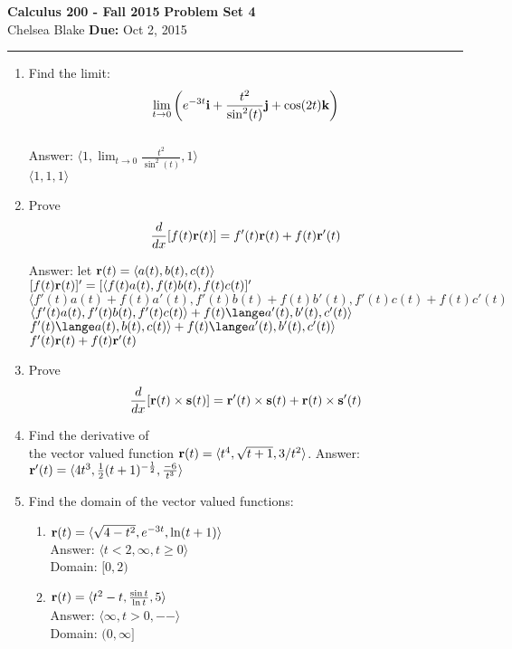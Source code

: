 \documentclass[11pt]{article}
\newcommand{\hwheadings}[3]{
{\bf Calculus 200 -  Fall 2015} \hfill {{\bf Problem Set #1}}\\
{{\bf } #2} \hfill {{\bf Due:} #3} \\
\rule[0.1in]{\textwidth}{0.025in}
}
\begin{document}
\hwheadings{4}{Chelsea Blake}{Oct 2, 2015}


\begin{enumerate}

 \item Find the limit: $$ \lim_{t \to 0} \left( e^{-3t} {\bf i} + \frac{t^2}{\sin^2(t)} {\bf j} + \cos (2t) {\bf k}  \right)$$
 \\
 Answer:
$\langle 1, \lim_{t \to 0}  \frac{t^2}{\sin^2(t)}, 1 \rangle  $
\\
$\langle 1, 1, 1 \rangle  $



\item Prove $$\frac{d}{dx}[f(t) {\bf r}(t)] = f'(t) {\bf r}(t)  + f(t) {\bf r}'(t) $$   

Answer: let ${\bf r}(t)= \langle a(t),b(t),c(t) \rangle$
\\
$[f(t){\bf r}(t)]'=[\langle f(t)a(t),f(t)b(t),f(t)c(t)]'$
\\
$\langle f'(t)a(t)+f(t)a'(t),f'(t)b(t)+f(t)b'(t),f'(t)c(t)+f(t)c'(t)$
\\
$\langle f'(t)a(t),f'(t)b(t),f'(t)c(t)\rangle + f(t)\lange a'(t),b'(t),c'(t)\rangle$
\\
$f'(t)\lange a(t),b(t),c(t)\rangle+ f(t)\lange a'(t),b'(t),c'(t)\rangle$
\\
$f'(t)  {\bf r}(t) + f(t) {\bf r}'(t)$



\item Prove $$\frac{d}{dx}[{\bf r}(t) \times {\bf s}(t)] = {\bf r}'(t) \times {\bf s}(t) + {\bf r}(t) \times {\bf s}'(t)$$    





\item Find the derivative of
\\the vector valued function ${\bf r}(t) = \langle t^4, \sqrt{t+1}, 3/t^2 \rangle$.
Answer:
\\
$ {\bf r}'(t)= \langle 4t^3,\frac{1}{2}(t+1)^{-\frac{1}{2}}, \frac{-6}{t^3} \rangle$




    \item Find the domain of the vector valued functions:
    \begin{enumerate}
        \item ${\bf r}(t) = \langle \sqrt{4-t^2}, e^{-3t}, \ln(t+1) \rangle$
        \\
        Answer: $\langle t<2, \infty, t \ge 0 \rangle$ 
        \\
        Domain: $[0,2)$
        \item ${\bf r}(t) = \langle t^2-t, \frac{\sin t}{\ln t}, 5 \rangle$
        \\
        Answer: $\langle \infty, t > 0, -- \rangle$
        \\
        Domain: $(0, \infty]$
        

\end{enumerate}
\end{enumerate}
\end{document}
